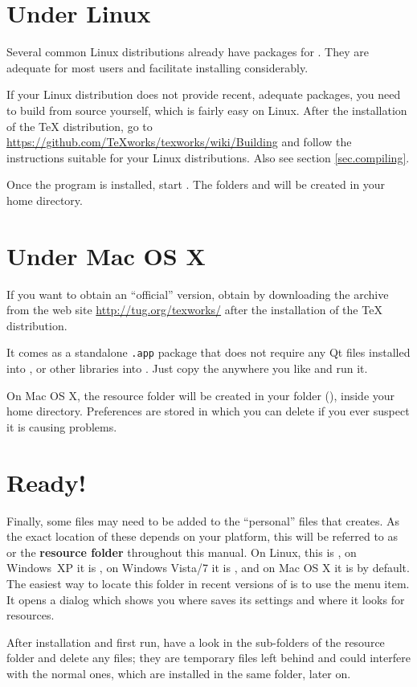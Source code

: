 \section{Under Linux}

Several common Linux distributions already have packages for {\Tw}. They are adequate for most users and facilitate installing {\Tw} considerably.

If your Linux distribution does not provide recent, adequate packages, you need to build {\Tw} from source yourself, which is fairly easy on Linux. After the installation of the {\TeX} distribution, go to \url{https://github.com/TeXworks/texworks/wiki/Building} and follow the instructions suitable for your Linux distributions. Also see section \ref{sec.compiling}.

Once the program is installed, start {\Tw}. The folders  and  will be created in your home directory.

\section{Under Mac OS X}

If you want to obtain an ``official'' version, obtain {\Tw} by downloading the archive from the {\Tw} web site \url{http://tug.org/texworks/} after the installation of the {\TeX} distribution.

It comes as a standalone \texttt{.app} package that does not require any Qt files installed into , or other libraries into . Just copy the  anywhere you like and run it.

On Mac OS X, the {\Tw} resource folder will be created in your  folder (), inside your home directory. Preferences are stored in 
which you can delete if you ever suspect it is causing problems.

\section{Ready!}

Finally, some files may need to be added to the ``personal'' files that {\Tw} creates. As the exact location of these depends on your platform, this will be referred to as  or the \textbf{{\Tw} resource folder} throughout this manual. On Linux, this is , on Windows~XP it is , on Windows Vista/7 it is , and on Mac OS X it is  by default. The easiest way to locate this folder in recent versions of {\Tw} is to use the \submenu{} menu item. It opens a dialog which shows you where {\Tw} saves its settings and where it looks for resources.

After installation and first run, have a look in the sub-folders of the {\Tw} resource folder and delete any  files; they are temporary files left behind and could interfere with the normal ones, which are installed in the same folder, later on.
